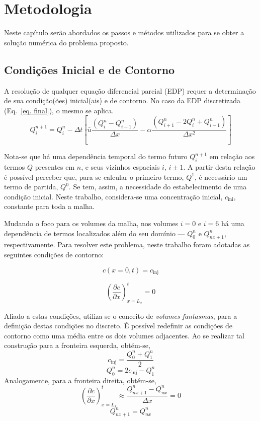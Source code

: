 \chapter{Metodologia}
Neste capítulo serão abordados os passos e métodos utilizados para se obter a
solução numérica do problema proposto.

\section{Condições Inicial e de Contorno}
A resolução de qualquer equação diferencial parcial (EDP) requer a determinação
de sua condição(ões) inicial(ais) e de contorno. No caso da EDP discretizada
(Eq.\ \ref{eq. final}), o mesmo se aplica.
\[
    Q_i^{n+1} = Q_i^n - \Delta t
    \left[
    \bar{u}\frac{(Q_i^n - Q_{i-1}^n)}{\Delta x}
    -
    \alpha\frac{(Q_{i+1}^n - 2Q_i^n + Q_{i-1}^n)}{\Delta x^2}
    \right]
\]

Nota-se que há uma dependência temporal do termo futuro $Q_i^{n+1}$ em relação
aos termos $Q$ presentes em $n$, e seus vizinhos espaciais $i$, ${i\pm1}$. A
partir desta relação é possível perceber que, para se calcular o primeiro
termo, $Q^1$, é necessário um termo de partida, $Q^0$. Se tem, assim, a
necessidade do estabelecimento de uma condição inicial. Neste trabalho,
considera-se uma concentração inicial, $c_{\text{ini}}$, constante para toda a
malha.

Mudando o foco para os volumes da malha, nos volumes $i=0$ e $i=6$ há uma
dependência de termos localizados além do seu domínio --- $Q_0^n$ e
$Q_{nx+1}^n$, respectivamente. Para resolver este problema, neste trabalho
foram adotadas as seguintes condições de contorno:

\noindent
\begin{minipage}{.5\linewidth}
    \begin{equation}
        c(x=0,t) = c_{\text{inj}}
    \end{equation}
\end{minipage}%
\begin{minipage}{.5\linewidth}
    \begin{equation}
        \left(\frac{\partial c}{\partial x}\right)_{x=L_x}^t = 0
    \end{equation}
\end{minipage}

\bigskip

Aliado a estas condições, utiliza-se o conceito de \emph{volumes fantasmas},
para a definição destas condições no discreto. É possível redefinir as
condições de contorno como uma média entre os dois volumes adjacentes. Ao se
realizar tal construção para a fronteira esquerda, obtém-se,
\[
    c_{\text{inj}} = \frac{Q_0^n + Q_1^n}{2}
\]
\begin{equation}\label{cont. esq}
    Q_0^n = 2c_{\text{inj}} - Q_1^n
\end{equation}
Analogamente, para a fronteira direita, obtém-se,
\[
  \left(\frac{\partial c}{\partial x}\right)_{x=L_x}^t
  \approx
  \frac{Q_{nx+1}^n - Q_{nx}^n}{\Delta x} = 0
\]
\begin{equation}\label{cont. dir}
    Q_{nx+1}^n = Q_{nx}^n
\end{equation}

